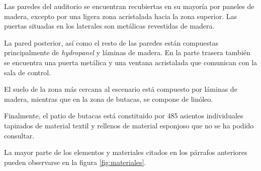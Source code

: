 \documentclass[11pt,a4paper]{book}
\begin{document}
 			Las paredes del auditorio se encuentran recubiertas en su mayoría por paneles de madera, excepto por una ligera zona acristalada hacia la zona superior. Las puertas situadas en los laterales son metálicas revestidas de madera. 
 
 			La pared posterior, así como el resto de las paredes están compuestas principalmente de \textit{hydropanel} y láminas de madera. En la parte trasera también se encuentra una puerta metálica y una ventana acristalada que comunican con la sala de control.
 
 			El suelo de la zona más cercana al escenario está compuesto por láminas de madera, mientras que en la zona de butacas, se compone de linóleo.
 			
 			Finalmente, el patio de butacas está constituido por 485 asientos individuales tapizados de material textil y rellenos de material esponjoso que no se ha podido consultar.
 
 			La mayor parte de los elementos y materiales citados en los párrafos anteriores pueden observarse en la figura \ref{fig:materiales}.
 
\end{document}
